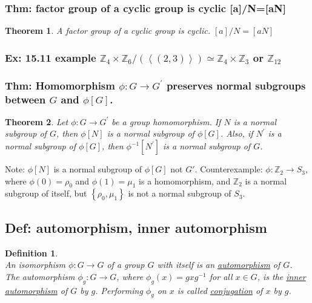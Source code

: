 \documentclass[11pt,a4paper]{article}
\newtheorem{theorem}{Theorem}
\newtheorem{definition}{Definition}
\begin{document}
\subsubsection{Thm: factor group of a cyclic group is cyclic [a]/N=[aN]}
\begin{theorem}
    A factor group of a cyclic group is cyclic. $[a]/N=[aN]$
\end{theorem}

\subsubsection{Ex: 15.11 example $\mathbb{Z}_4\times \mathbb{Z}_6/(\left\langle (2,3)\right\rangle)\simeq \mathbb{Z}_4\times \mathbb{Z}_3$ or $\mathbb{Z}_{12}$}



\subsubsection{Thm: Homomorphism $\phi: G \rightarrow G^{\prime}$ preserves normal subgroups between $G$ and $\phi[G]$.}
\begin{theorem}
    Let $\phi: G \rightarrow G^{\prime}$ be a group homomorphism. If $N$ is a normal subgroup of $G$, then $\phi[N]$ is a normal subgroup of $\phi[G]$. Also, if $N^{\prime}$ is a normal subgroup of $\phi[G]$, then $\phi^{-1}\left[N^{\prime}\right]$ is a normal subgroup of $G$.
\end{theorem}
Note: $\phi[N]$ is a normal subgroup of $\phi[G]$ not $G'$. Counterexample: $\phi: \mathbb{Z}_{2} \rightarrow S_{3}$, where $\phi(0)=\rho_{0}$ and $\phi(1)=\mu_{1}$ is a homomorphism, and $\mathbb{Z}_{2}$ is a normal subgroup of itself, but $\left\{\rho_{0}, \mu_{1}\right\}$ is not a normal subgroup of $S_{3}$.





\subsection{Def: automorphism, inner automorphism}
\begin{definition}
    \quad\\
    An isomorphism $\phi : G \rightarrow G$ of a group $G$ with itself is an \underline{automorphism} of $G$.\\
    The automorphism $\phi_g : G \rightarrow G$, where $\phi_g(x) = gxg^{-1}$ for all $x \in G$, is the \underline{inner automorphism} of $G$ by $g$. Performing $\phi_g$ on $x$ is called \underline{conjugation} of $x$ by $g$.
\end{definition}
\end{document}
